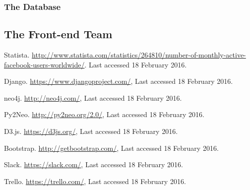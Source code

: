 \documentclass[10pt,onecolumn]{article}
\begin{document}
\subsubsection{The Database}



\subsection{The Front-end Team}



\begin{thebibliography}{1}
 Statista. \url {http://www.statista.com/statistics/264810/number-of-monthly-active-facebook-users-worldwide/}. Last accessed 18 February 2016. 

  Django. \url{https://www.djangoproject.com/}, Last accessed 18 February 2016.

 neo4j. \url{http://neo4j.com/}, Last accessed 18 February 2016.

 Py2Neo. \url{http://py2neo.org/2.0/}, Last accessed 18 February 2016.

 D3.js. \url{https://d3js.org/}, Last accessed 18 February 2016.


 Bootstrap. \url{http://getbootstrap.com/}, Last accessed 18 February 2016.

 Slack. \url{https://slack.com/}, Last accessed 18 February 2016.

 Trello. \url{https://trello.com/}, Last accessed 18 February 2016.
	
\end{thebibliography}

\clearpage
\end{document}

